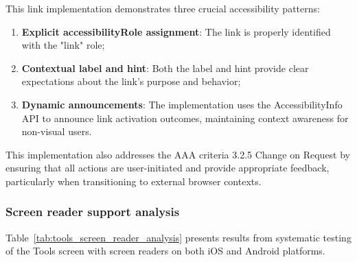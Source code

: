 This link implementation demonstrates three crucial accessibility patterns:

\begin{enumerate}
    \item \textbf{Explicit accessibilityRole assignment}: The link is properly identified with the "link" role;
    
    \item \textbf{Contextual label and hint}: Both the label and hint provide clear expectations about the link's purpose and behavior;
    
    \item \textbf{Dynamic announcements}: The implementation uses the AccessibilityInfo API to announce link activation outcomes, maintaining context awareness for non-visual users.
\end{enumerate}

This implementation also addresses the AAA criteria 3.2.5 Change on Request by ensuring that all actions are user-initiated and provide appropriate feedback, particularly when transitioning to external browser contexts.

\subsubsection{Screen reader support analysis}

Table~\ref{tab:tools_screen_reader_analysis} presents results from systematic testing of the Tools screen with screen readers on both iOS and Android platforms.

